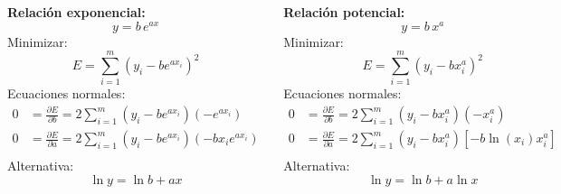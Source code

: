 \documentclass[9pt, aspectratio=169]{beamer}
\begin{document}
\begin{frame}
\begin{columns}[t]
\cx 
\textbf{Relación exponencial:}
\[ y = b \, e^{a x} \]
Minimizar:
\[ E = \sum_{i=1}^m (y_i - b e^{a x_i})^2 \]
Ecuaciones normales:
\begin{align*}
0 &= \frac{\partial E}{\partial b} = 2 \sum_{i=1}^m (y_i - b e^{a x_i})(-e^{a x_i}) \\
0 &= \frac{\partial E}{\partial a} = 2 \sum_{i=1}^m (y_i - b e^{a x_i})(-b x_i e^{a x_i}) \\
\end{align*}
\alert{Alternativa:}
\[ \ln y = \ln b + a x \]

\cx
\textbf{Relación potencial:}
\[ y = b \, x^{a} \]
Minimizar:
\[ E = \sum_{i=1}^m (y_i - b x_i^a)^2 \]
Ecuaciones normales:
\begin{align*}
0 &= \frac{\partial E}{\partial b} = 2 \sum_{i=1}^m (y_i - b x_i^{a})(-x_i^{a}) \\
0 &= \frac{\partial E}{\partial a} = 2 \sum_{i=1}^m (y_i - b x_i^{a})[-b \ln(x_i) x_i^{a}] \\
\end{align*}
\alert{Alternativa:}
\[ \ln y = \ln b + a \ln x \]
\end{columns}
\end{frame}
\end{document}
